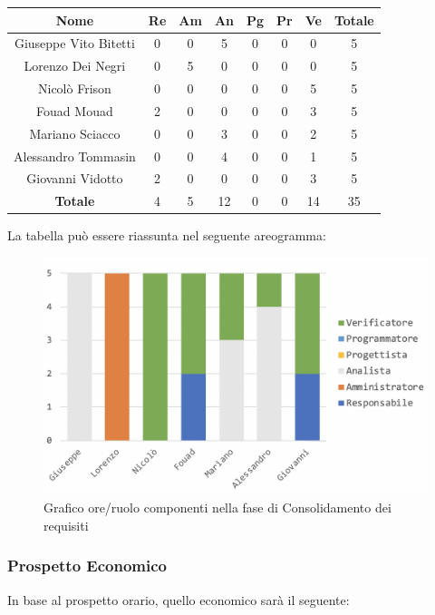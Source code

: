 			\begin{longtable}{|c|c|c|c|c|c|c|c}
				\hline
				\rowcolor{lighter-grayer}
				\textbf{Nome} & \textbf{Re} & \textbf{Am} & \textbf{An} & \textbf{Pg}  & \textbf{Pr}   & \textbf{Ve} & \textbf{Totale} \\
				\hline
				\endfirsthead
				
				\hline
				Giuseppe Vito Bitetti & 0 & 0 & 5 & 0 & 0 & 0 & 5\\
				\hline
				\hline
				Lorenzo Dei Negri & 0 & 5 & 0 & 0 & 0 & 0 & 5\\
				\hline
				\hline
				Nicolò Frison & 0 & 0 & 0 & 0 & 0 & 5 & 5\\
				\hline
				\hline
				Fouad Mouad & 2 & 0 & 0 & 0 & 0 & 3 & 5\\
				\hline
				\hline
				Mariano Sciacco & 0 & 0 & 3 & 0 & 0 & 2 & 5\\
				\hline
				\hline
				Alessandro Tommasin & 0 & 0 & 4 & 0 & 0 & 1 & 5\\
				\hline
				\hline
				Giovanni Vidotto & 2 & 0 & 0 & 0 & 0 & 3 & 5\\
				\hline 
				\textbf{Totale} & 4 &  5 & 12 & 0 & 0 & 14 & 35\\
				\hline
			\end{longtable}
			\pagebreak
		
			La tabella può essere riassunta nel seguente areogramma:
			\begin{figure}[H]
				\centering
				\includegraphics[width=0.8\linewidth]{./images/consRequisiti1.png}
				\caption{Grafico ore/ruolo componenti nella fase di Consolidamento dei requisiti}
				\label{fig:grafico suddivione ruoli fase Consolidamento requisiti}
			\end{figure}
		
		\subsubsection{Prospetto Economico}
		In base al prospetto orario, quello economico sarà il seguente: 
		

